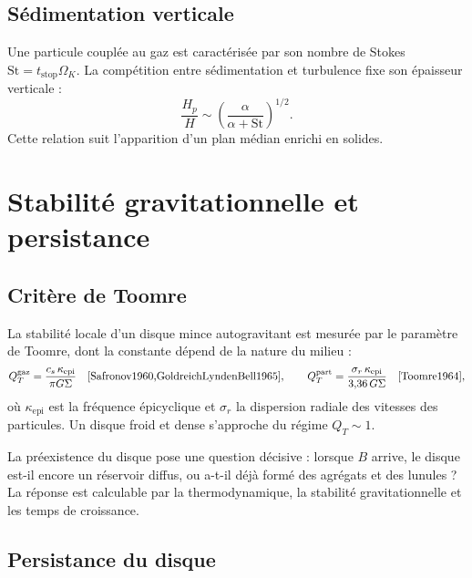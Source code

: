 \documentclass[11pt,a4paper,openany]{report}
\begin{document}
\subsection{Sédimentation verticale}

Une particule couplée au gaz est caractérisée par son nombre de Stokes
$\mathrm{St}=t_{\mathrm{stop}}\Omega_K$. La compétition entre sédimentation et turbulence fixe
son épaisseur verticale :
\begin{equation}
\frac{H_p}{H}\sim\left(\frac{\alpha}{\alpha+\mathrm{St}}\right)^{1/2}.
\label{eq:Hp}
\end{equation}
Cette relation suit l'apparition d'un plan médian enrichi en solides.


\section{Stabilité gravitationnelle et persistance}
\subsection{Critère de Toomre}

La stabilité locale d'un disque mince autogravitant est mesurée par le paramètre de Toomre,
dont la constante dépend de la nature du milieu :
\begin{equation}
Q_T^{\mathrm{gaz}}=\frac{c_s\,\kappa_{\mathrm{epi}}}{\pi G\Sigma}
\quad\text{\cite{Safronov1960,GoldreichLyndenBell1965}},
\qquad
Q_T^{\mathrm{part}}=\frac{\sigma_r\,\kappa_{\mathrm{epi}}}{3{,}36\,G\Sigma}
\quad\text{\cite{Toomre1964}},
\label{eq:Toomre}
\end{equation}
où $\kappa_{\mathrm{epi}}$ est la fréquence épicyclique et $\sigma_r$ la dispersion radiale des
vitesses des particules. Un disque froid et dense s'approche du régime $Q_T\sim1$.

\begin{ideephys}
La préexistence du disque pose une question décisive : lorsque $B$ arrive, le disque est-il
encore un réservoir diffus, ou a-t-il déjà formé des agrégats et des lunules ? La réponse est
calculable par la thermodynamique, la stabilité gravitationnelle et les temps de croissance.
\end{ideephys}

\subsection{Persistance du disque}
\end{document}
